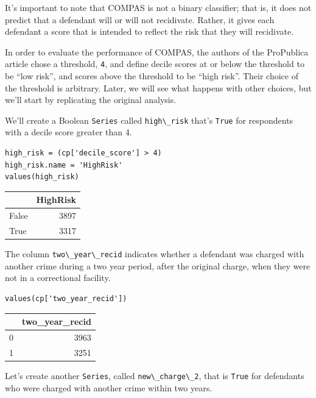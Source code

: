It's important to note that COMPAS is not a binary classifier; that is,
it does not predict that a defendant will or will not recidivate.
Rather, it gives each defendant a score that is intended to reflect the
risk that they will recidivate.

In order to evaluate the performance of COMPAS, the authors of the
ProPublica article chose a threshold, \passthrough{\lstinline!4!}, and
define decile scores at or below the threshold to be ``low risk'', and
scores above the threshold to be ``high risk''. Their choice of the
threshold is arbitrary. Later, we will see what happens with other
choices, but we'll start by replicating the original analysis.

We'll create a Boolean \passthrough{\lstinline!Series!} called
\passthrough{\lstinline!high\_risk!} that's
\passthrough{\lstinline!True!} for respondents with a decile score
greater than 4.

\begin{lstlisting}[]
high_risk = (cp['decile_score'] > 4)
high_risk.name = 'HighRisk'
values(high_risk)
\end{lstlisting}

\begin{tabular}{lr}
\midrule
{} &  HighRisk \\
\midrule
False &      3897 \\
True  &      3317 \\
\midrule
\end{tabular}

The column \passthrough{\lstinline!two\_year\_recid!} indicates whether
a defendant was charged with another crime during a two year period,
after the original charge, when they were not in a correctional
facility.

\begin{lstlisting}[]
values(cp['two_year_recid'])
\end{lstlisting}

\begin{tabular}{lr}
\midrule
{} &  two\_year\_recid \\
\midrule
0 &            3963 \\
1 &            3251 \\
\midrule
\end{tabular}

Let's create another \passthrough{\lstinline!Series!}, called
\passthrough{\lstinline!new\_charge\_2!}, that is
\passthrough{\lstinline!True!} for defendants who were charged with
another crime within two years.

